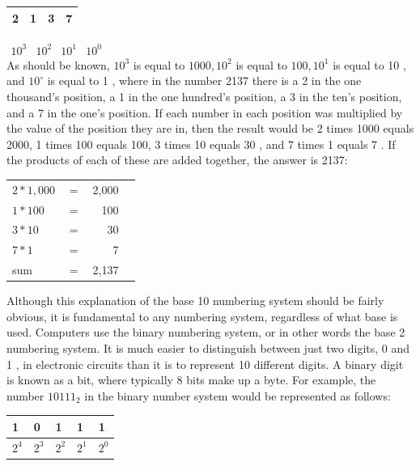 \documentclass[10pt]{article}
\begin{document}
\begin{center}
\begin{tabular}{|l|l|l|l|}
\hline
2 & 1 & 3 & 7 \\
\hline
\end{tabular}
\end{center}

$\begin{array}{llll}10^{3} & 10^{2} & 10^{1} & 10^{0}\end{array}$\\
As should be known, $10^{3}$ is equal to $1000,10^{2}$ is equal to $100,10^{1}$ is equal to 10 , and $10^{\circ}$ is equal to 1 , where in the number 2137 there is a 2 in the one thousand's position, a 1 in the one hundred's position, a 3 in the ten's position, and a 7 in the one's position. If each number in each position was multiplied by the value of the position they are in, then the result would be 2 times 1000 equals 2000, 1 times 100 equals 100, 3 times 10 equals 30 , and 7 times 1 equals 7 . If the products of each of these are added together, the answer is 2137:

\begin{center}
\begin{tabular}{llrr}
$2 * 1,000$ & $=$ & 2,000 \\
$1 * 100$ & $=$ & 100 \\
$3 * 10$ & $=$ & 30 \\
$7 * 1$ & $=$ & 7 \\
\hline
sum & $=$ & 2,137 \\
\hline
\end{tabular}
\end{center}

Although this explanation of the base 10 numbering system should be fairly obvious, it is fundamental to any numbering system, regardless of what base is used. Computers use the binary numbering system, or in other words the base 2 numbering system. It is much easier to distinguish between just two digits, 0 and 1 , in electronic circuits than it is to represent 10 different digits. A binary digit is known as a bit, where typically 8 bits make up a byte. For example, the number $10111_{2}$ in the binary number system would be represented as follows:

\begin{center}
\begin{tabular}{|l|l|l|l|l|}
\hline
1 & 0 & 1 & 1 & 1 \\
\hline
$2^{4}$ & $2^{3}$ & $2^{2}$ & $2^{1}$ & $2^{0}$ \\
\hline
\end{tabular}
\end{center}
\end{document}
